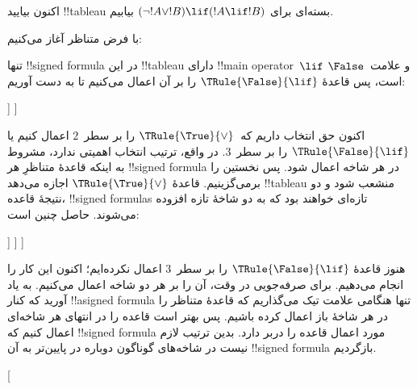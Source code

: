 \documentclass[../../../include/open-logic-section]{subfiles}
\begin{document}
\begin{ex}
اکنون بیایید !!{tableau} بسته‌ای برای $(\lnot !A \lor !B) \lif (!A
\lif !B)$ بیابیم.

با فرض متناظر آغاز می‌کنیم:
\begin{oltableau}
  [\sFmla{\False}{(\lnot \formula{A} \lor \formula{B}) \lif
      (\formula{A} \lif \formula{B})}, just=\TAss]
\end{oltableau}
تنها !!{signed formula} در این !!{tableau} دارای
!!{main operator}~$\lif$ و علامت~$\False$ است، پس قاعدهٔ
$\TRule{\False}{\lif}$ را بر آن اعمال می‌کنیم تا به دست آوریم:
\begin{oltableau}
  [\sFmla{\False}{(\lnot \formula{A} \lor \formula{B})
      \lif (\formula{A} \lif \formula{B})}, just=\TAss, checked
    [\sFmla{\True}{\lnot \formula{A} \lor \formula{B}},
      just={\TRule{\False}{\lif}[1]}
      [\sFmla{\False}{(\formula{A} \lif \formula{B})},
        just={\TRule{\False}{\lif}[1]}
      ]
    ]
  ]
\end{oltableau}
اکنون حق انتخاب داریم که~$\TRule{\True}{\lor}$ را بر سطر~$2$ اعمال کنیم
یا $\TRule{\False}{\lif}$ را بر سطر~$3$. در واقع، ترتیب انتخاب اهمیتی
ندارد، مشروط به اینکه قاعدهٔ متناظرِ هر !!{signed formula} در هر شاخه
اعمال شود. پس نخستین را برمی‌گزینیم. قاعدهٔ $\TRule{\True}{\lor}$ اجازه
می‌دهد !!{tableau} منشعب شود و دو نتیجهٔ قاعده، !!{signed formula}s تازه‌ای
خواهند بود که به دو شاخهٔ تازه افزوده می‌شوند. حاصل چنین است:
\begin{oltableau}
  [\sFmla{\False}{(\lnot \formula{A} \lor \formula{B}) \lif
      (\formula{A} \lif \formula{B})}, just=\TAss, checked
    [\sFmla{\True}{\lnot \formula{A} \lor \formula{B}},
      just={\TRule{\False}{\lif}[1]}, checked
      [\sFmla{\False}{(\formula{A} \lif \formula{B})},
        just={\TRule{\False}{\lif}[1]}
        [\sFmla{\True}{\lnot \formula{A}}, just={\TRule{\True}{\lor}[2]}]
        [\sFmla{\True}{\formula{B}}, just={\TRule{\True}{\lor}[2]}]
      ]
    ]
  ]
\end{oltableau}
هنوز قاعدهٔ $\TRule{\False}{\lif}$ را بر سطر~$3$ اعمال نکرده‌ایم؛ اکنون
این کار را انجام می‌دهیم. برای صرفه‌جویی در وقت، آن را بر هر دو شاخه
اعمال می‌کنیم. به یاد آورید که کنار !!a{signed formula} تنها هنگامی علامت
تیک می‌گذاریم که قاعدهٔ متناظر را در هر شاخهٔ باز اعمال کرده باشیم. پس
بهتر است قاعده را در انتهای هر شاخه‌ای اعمال کنیم که !!{signed formula}
مورد اعمال قاعده را دربر دارد. بدین ترتیب لازم نیست در شاخه‌های گوناگون
دوباره در پایین‌تر به آن !!{signed formula} بازگردیم.
\begin{oltableau}
  [
\end{oltableau}
\end{ex}
\end{document}
